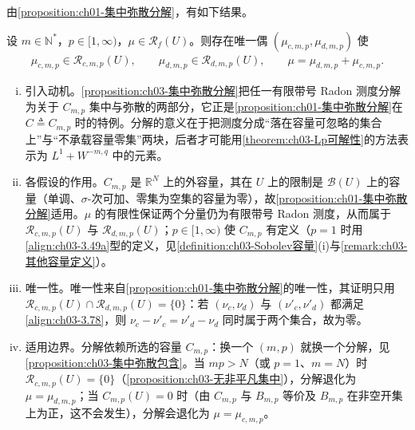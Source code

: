 \documentclass[../../main.tex]{subfiles}%
\begin{document}
由\cref{proposition:ch01-集中弥散分解}，有如下结果。

\begin{proposition}\label{proposition:ch03-集中弥散分解}
设 $m\in\mathbb{N}^*$，$p\in[1,\infty)$，$\mu\in\mathscr{R}_f(U)$。则存在唯一偶 $(\mu_{c,m,p},\mu_{d,m,p})$ 使
\begin{align}
\mu_{c,m,p}\in\mathscr{R}_{c,m,p}(U),\qquad \mu_{d,m,p}\in\mathscr{R}_{d,m,p}(U),\qquad
\mu=\mu_{d,m,p}+\mu_{c,m,p}.\label{align:ch03-3.78}
\end{align}
\end{proposition}

\begin{remark}\label{remark:ch03-集中弥散分解动机}
\begin{enumerate}[(i)]
\item 引入动机。\cref{proposition:ch03-集中弥散分解}把任一有限带号 Radon 测度分解为关于 $C_{m,p}$ 集中与弥散的两部分，它正是\cref{proposition:ch01-集中弥散分解}在 $C\triangleq C_{m,p}$ 时的特例。分解的意义在于把测度分成“落在容量可忽略的集合上”与“不承载容量零集”两块，后者才可能用\cref{theorem:ch03-Lp可解性}的方法表示为 $L^1+W^{-m,q}$ 中的元素。
\item 各假设的作用。$C_{m,p}$ 是 $\mathbb{R}^N$ 上的外容量，其在 $U$ 上的限制是 $\mathcal{B}(U)$ 上的容量（单调、$\sigma$-次可加、零集为空集的容量为零），故\cref{proposition:ch01-集中弥散分解}适用。$\mu$ 的有限性保证两个分量仍为有限带号 Radon 测度，从而属于 $\mathscr{R}_{c,m,p}(U)$ 与 $\mathscr{R}_{d,m,p}(U)$；$p\in[1,\infty)$ 使 $C_{m,p}$ 有定义（$p=1$ 时用\eqref{align:ch03-3.49a}型的定义，见\cref{definition:ch03-Sobolev容量}(i)与\cref{remark:ch03-其他容量定义}）。
\item 唯一性。唯一性来自\cref{proposition:ch01-集中弥散分解}的唯一性，其证明只用 $\mathscr{R}_{c,m,p}(U)\cap\mathscr{R}_{d,m,p}(U)=\{0\}$：若 $(\nu_c,\nu_d)$ 与 $(\nu'_c,\nu'_d)$ 都满足\eqref{align:ch03-3.78}，则 $\nu_c-\nu'_c=\nu'_d-\nu_d$ 同时属于两个集合，故为零。
\item 适用边界。分解依赖所选的容量 $C_{m,p}$：换一个 $(m,p)$ 就换一个分解，见\cref{proposition:ch03-集中弥散包含}。当 $mp>N$（或 $p=1$、$m=N$）时 $\mathscr{R}_{c,m,p}(U)=\{0\}$（\cref{proposition:ch03-无非平凡集中}），分解退化为 $\mu=\mu_{d,m,p}$；当 $C_{m,p}(U)=0$ 时（由 $C_{m,p}$ 与 $B_{m,p}$ 等价及 $B_{m,p}$ 在非空开集上为正，这不会发生），分解会退化为 $\mu=\mu_{c,m,p}$。
\end{enumerate}
\end{remark}
\end{document}
